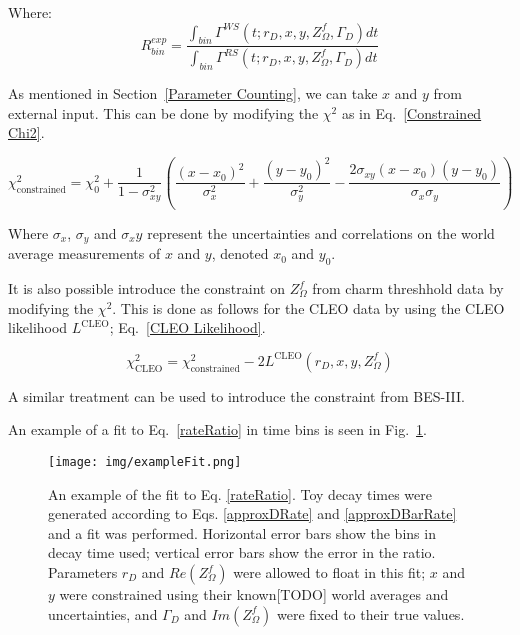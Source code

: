 \documentclass[note.tex]{subfiles}
\begin{document}
Where:
\begin{equation}
    R^{exp}_{bin} = \frac{\int_{bin}\Gamma^{WS}(t; r_D, x, y, Z_\Omega^f, \Gamma_D)dt}{\int_{bin}\Gamma^{RS}(t; r_D, x, y, Z_\Omega^f, \Gamma_D)dt}
    \label{Expected Bin Population}
\end{equation}

As mentioned in Section~\ref{Parameter Counting}, we can take $x$ and $y$ from external input.
This can be done by modifying the $\chi^2$ as in Eq.~\ref{Constrained Chi2}.

\begin{equation}
    \chi^2_{\mathrm{constrained}} = \chi^2_0 + \frac{1}{1 - \sigma_{xy}^2}\left(\frac{(x-x_0)^2}{\sigma_x^2}+\frac{(y-y_0)^2}{\sigma_y^2}-\frac{2\sigma_{xy}(x-x_0)(y-y_0)}{\sigma_x\sigma_y}\right)
    \label{Constrained Chi2}
\end{equation}

Where $\sigma_x$, $\sigma_y$ and $\sigma_xy$ represent the uncertainties and correlations on the world average
measurements of $x$ and $y$, denoted $x_0$ and $y_0$.

It is also possible introduce the constraint on $Z_\Omega^f$ from charm threshhold data by modifying the $\chi^2$.
This is done as follows for the CLEO data by using the CLEO likelihood $L^\mathrm{CLEO}$; Eq.~\ref{CLEO Likelihood}.

\begin{equation}
    \chi^2_{\mathrm{CLEO}} = \chi^2_{\mathrm{constrained}} - 2 L^\mathrm{CLEO}(r_D, x, y, Z_\Omega^f)
    \label{CLEO Likelihood}
\end{equation}

A similar treatment can be used to introduce the constraint from BES-III.

An example of a fit to Eq.~\ref{rateRatio} in time bins is seen in Fig.~\ref{exampleFit}.
\begin{figure}[htb!]
    \centering
    \texttt{[image: img/exampleFit.png]}
    \caption{An example of the fit to Eq. \ref{rateRatio}.
        Toy decay times were generated according to Eqs. \ref{approxDRate} and \ref{approxDBarRate} and a fit was performed.
        Horizontal error bars show the bins in decay time used; vertical error bars show the error in the ratio.
        Parameters $r_D$ and $Re(Z_\Omega^f)$ were allowed to float in this fit; $x$ and $y$ were constrained using their known[TODO] world averages and uncertainties,
        and $\Gamma_D$ and $Im(Z_\Omega^f)$ were fixed to their true values.
    }
    \label{exampleFit}
\end{figure}
\end{document}
